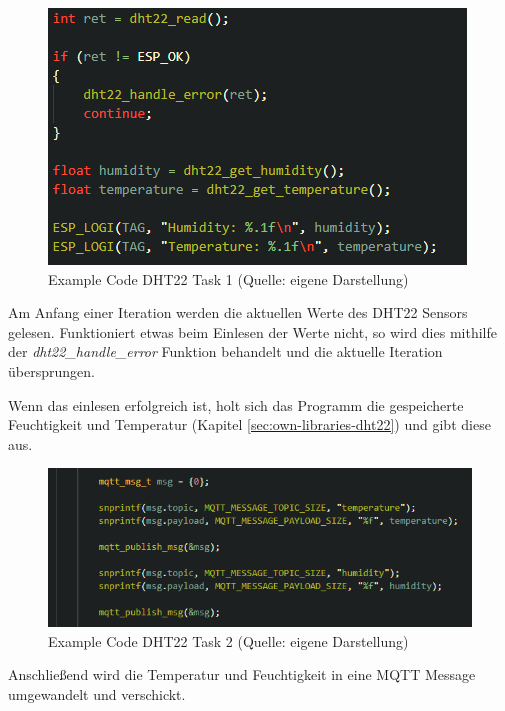 \begin{figure}[H]
    \begin{center}
        \includegraphics[scale=0.8]{images/example_code_dht22_task_one.png}
        \caption{Example Code DHT22 Task 1 (Quelle: eigene Darstellung)}
        \label{abb:example_code_dht22_task_one}
    \end{center}
\end{figure}

Am Anfang einer Iteration werden die aktuellen Werte des DHT22 Sensors gelesen. Funktioniert etwas beim Einlesen der Werte nicht, so wird dies mithilfe der \textit{dht22\_handle\_error} Funktion behandelt und die aktuelle Iteration übersprungen.

Wenn das einlesen erfolgreich ist, holt sich das Programm die gespeicherte Feuchtigkeit und Temperatur (Kapitel \ref{sec:own-libraries-dht22}) und gibt diese aus.

\begin{figure}[H]
    \begin{center}
        \includegraphics[scale=0.8]{images/example_code_dht22_task_two.png}
        \caption{Example Code DHT22 Task 2 (Quelle: eigene Darstellung)}
        \label{abb:example_code_dht22_task_two}
    \end{center}
\end{figure}

Anschließend wird die Temperatur und Feuchtigkeit in eine MQTT Message umgewandelt und verschickt.

